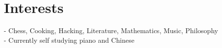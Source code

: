 \section*{Interests}
- Chess, Cooking, Hacking, Literature, Mathematics, Music, Philosophy \\
- Currently self studying piano and Chinese
